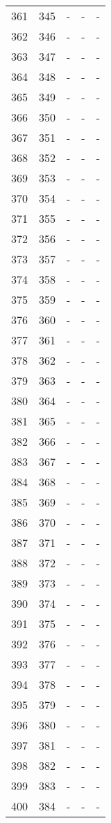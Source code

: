 \documentclass[10pt]{article}
\begin{document}
\begin {longtable}{l r r r r}
361 & 345 & - & - & - \\
362 & 346 & - & - & - \\
363 & 347 & - & - & - \\
364 & 348 & - & - & - \\
365 & 349 & - & - & - \\
366 & 350 & - & - & - \\
367 & 351 & - & - & - \\
368 & 352 & - & - & - \\
369 & 353 & - & - & - \\
370 & 354 & - & - & - \\
371 & 355 & - & - & - \\
372 & 356 & - & - & - \\
373 & 357 & - & - & - \\
374 & 358 & - & - & - \\
375 & 359 & - & - & - \\
376 & 360 & - & - & - \\
377 & 361 & - & - & - \\
378 & 362 & - & - & - \\
379 & 363 & - & - & - \\
380 & 364 & - & - & - \\
381 & 365 & - & - & - \\
382 & 366 & - & - & - \\
383 & 367 & - & - & - \\
384 & 368 & - & - & - \\
385 & 369 & - & - & - \\
386 & 370 & - & - & - \\
387 & 371 & - & - & - \\
388 & 372 & - & - & - \\
389 & 373 & - & - & - \\
390 & 374 & - & - & - \\
391 & 375 & - & - & - \\
392 & 376 & - & - & - \\
393 & 377 & - & - & - \\
394 & 378 & - & - & - \\
395 & 379 & - & - & - \\
396 & 380 & - & - & - \\
397 & 381 & - & - & - \\
398 & 382 & - & - & - \\
399 & 383 & - & - & - \\
400 & 384 & - & - & - \\

\end{longtable}
\end{document}
